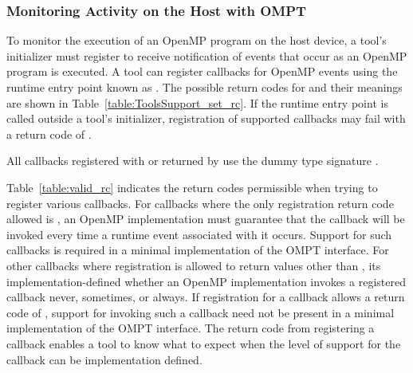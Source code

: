 \subsubsection{Monitoring Activity on the Host with OMPT}
\label{sec:ompt-register-callbacks}

To monitor the execution of an OpenMP program on the host device, a tool's
initializer must register to receive notification
of events that occur as an OpenMP program is executed.
A tool can register callbacks for OpenMP events using
the runtime entry point known as
.  The possible return codes for
 and their meanings are shown in
Table~\ref{table:ToolsSupport_set_rc}.
If the  runtime entry point is
called outside a tool's initializer, registration of supported
callbacks may fail with a return code of .

All callbacks registered with  or returned
by  use the dummy type signature
.

Table~\ref{table:valid_rc} indicates the return codes permissible
when trying to register various callbacks. For callbacks where the only registration return code
allowed is , an
OpenMP implementation must guarantee that the callback will be
invoked every time a runtime event associated with it occurs. Support
for such callbacks is required in a minimal implementation of the
OMPT interface. For other callbacks where registration is allowed to return values
other than , its implementation-defined
whether an OpenMP implementation invokes a registered callback
never, sometimes, or always. If registration for a callback allows
a return code of , support for invoking such
a callback need not be present in a minimal implementation of the
OMPT interface.  The return code from registering a callback
enables a tool to know what to expect when the level
of support for the callback can be implementation defined.




